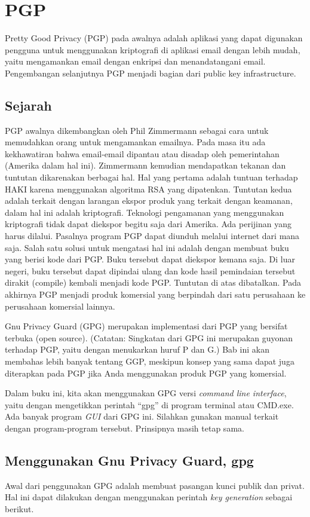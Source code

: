 \chapter{PGP}
Pretty Good Privacy (PGP) pada awalnya adalah aplikasi yang dapat digunakan
pengguna untuk menggunakan kriptografi di aplikasi email dengan lebih mudah,
yaitu mengamankan email dengan enkripsi dan menandatangani email.
Pengembangan selanjutnya PGP menjadi bagian dari public key infrastructure.

\section{Sejarah}
PGP awalnya dikembangkan oleh Phil Zimmermann sebagai cara untuk memudahkan
orang untuk mengamankan emailnya. Pada masa itu ada kekhawatiran bahwa
email-email dipantau atau disadap oleh pemerintahan (Amerika dalam hal ini).
Zimmermann kemudian mendapatkan tekanan dan tuntutan dikarenakan berbagai hal.
Hal yang pertama adalah tuntuan terhadap HAKI karena menggunakan algoritma
RSA yang dipatenkan.
Tuntutan kedua adalah terkait dengan larangan ekspor produk yang terkait
dengan keamanan, dalam hal ini adalah kriptografi.
Teknologi pengamanan yang menggunakan kriptografi tidak dapat diekspor
begitu saja dari Amerika. Ada perijinan yang harus dilalui.
Pasalnya program PGP dapat diunduh melalui internet dari mana saja.
Salah satu solusi untuk mengatasi hal ini adalah dengan membuat buku yang
berisi kode dari PGP. Buku tersebut dapat diekspor kemana saja. 
Di luar negeri, buku tersebut dapat dipindai ulang dan kode hasil pemindaian
tersebut dirakit (compile) kembali menjadi kode PGP.
Tuntutan di atas dibatalkan.
Pada akhirnya PGP menjadi produk komersial yang berpindah dari satu perusahaan
ke perusahaan komersial lainnya.

Gnu Privacy Guard (GPG) merupakan implementasi dari PGP yang bersifat terbuka
(open source).
(Catatan: Singkatan dari GPG ini merupakan guyonan terhadap PGP,
yaitu dengan menukarkan huruf P dan G.) 
Bab ini akan membahas lebih banyak tentang GGP, meskipun konsep yang sama dapat juga
diterapkan pada PGP jika Anda menggunakan produk PGP yang komersial.

Dalam buku ini, kita akan menggunakan GPG versi {\em command line interface},
yaitu dengan mengetikkan perintah ``gpg'' di program terminal atau CMD.exe.
Ada banyak program {\em GUI} dari GPG ini. Silahkan gunakan manual terkait
dengan program-program tersebut. Prinsipnya masih tetap sama.

\section{Menggunakan Gnu Privacy Guard, gpg}
Awal dari penggunakan GPG adalah membuat pasangan kunci publik dan privat. Hal
ini dapat dilakukan dengan menggunakan perintah {\em  key generation} 
sebagai berikut.

